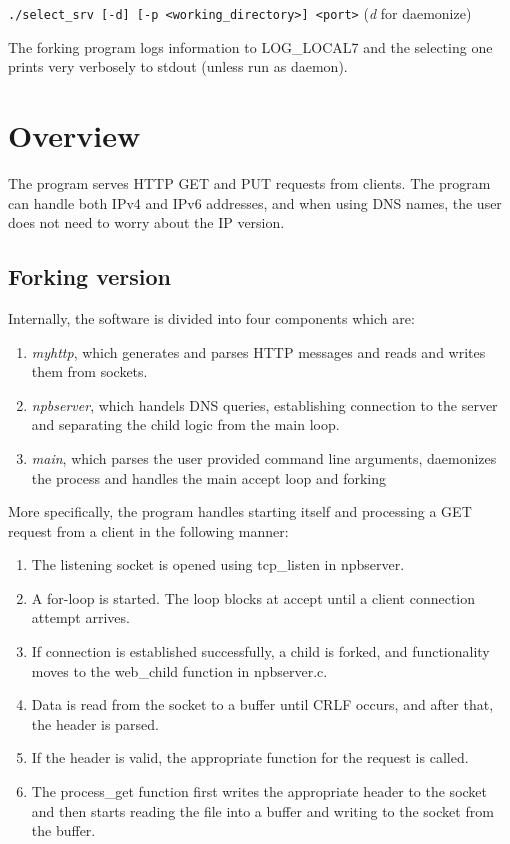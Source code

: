 \documentclass[a4paper,12pt]{article}
\begin{document}
{\tt ./select_srv [-d] [-p <working_directory>] <port>} (\emph{d} for daemonize)

The forking program logs information to LOG_LOCAL7 and the selecting one prints very verbosely to stdout (unless run as daemon).

\section{Overview}

The program serves HTTP GET and PUT requests from clients. The program can handle both IPv4 and IPv6 addresses, and when using DNS names, the user does not need to worry about the IP version.

\subsection{Forking version}
Internally, the software is divided into four components which are:

\begin{enumerate}
\item \emph{myhttp}, which generates and parses HTTP messages and reads and writes them from sockets.
\item \emph{npbserver}, which handels DNS queries, establishing connection to the server and separating the child logic from the main loop.
\item \emph{main}, which parses the user provided command line arguments, daemonizes the process and handles the main accept loop and forking
\end{enumerate}

More specifically, the program handles starting itself and processing a GET request from a client in the following manner:

\sloppy

\begin{enumerate}
\item The listening socket is opened using tcp\_listen in npbserver.
\item A for-loop is started. The loop blocks at accept until a client connection attempt arrives.
\item If connection is established successfully, a child is forked, and functionality moves to the web\_child function in npbserver.c.
\item Data is read from the socket to a buffer until CRLF occurs, and after that, the header is parsed.
\item If the header is valid, the appropriate function for the request is called.
\item The process\_get function first writes the appropriate header to the socket and then starts reading the file into a buffer and writing to the socket from the buffer.
\end{enumerate}
\end{document}
